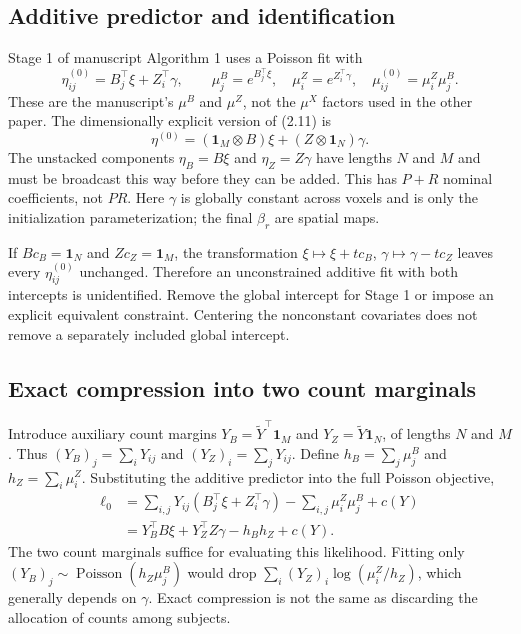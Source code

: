\documentclass[11pt,a4paper]{article}
\numberwithin{equation}{section}
\begin{document}
\subsection{Additive predictor and identification}
Stage 1 of manuscript Algorithm 1 uses a Poisson fit with
\[
 \eta_{ij}^{(0)}=B_j^\top\xi+Z_i^\top\gamma,\qquad
 \mu_j^B=e^{B_j^\top\xi},\quad \mu_i^Z=e^{Z_i^\top\gamma},\quad
 \mu_{ij}^{(0)}=\mu_i^Z\mu_j^B.
\]
These are the manuscript's $\mu^B$ and $\mu^Z$, not the
$\mu^X$ factors used in the other paper.
The dimensionally explicit version of (2.11) is
\[
 \eta^{(0)}=(\mathbf1_M\otimes B)\xi
                      +(Z\otimes\mathbf1_N)\gamma.
\]
The unstacked components $\eta_B=B\xi$ and $\eta_Z=Z\gamma$
have lengths $N$ and $M$ and must be broadcast this way before
they can be added.
This has $P+R$ nominal coefficients, not $PR$.
Here $\gamma$ is globally constant across voxels and is only the
initialization parameterization; the final $\beta_r$ are spatial maps.

If $Bc_B=\mathbf1_N$ and $Zc_Z=\mathbf1_M$, the transformation
$\xi\mapsto\xi+tc_B$, $\gamma\mapsto\gamma-tc_Z$ leaves every
$\eta_{ij}^{(0)}$ unchanged.
Therefore an unconstrained additive fit with both intercepts is
unidentified. Remove the global intercept for Stage 1 or impose an
explicit equivalent constraint.
Centering the nonconstant covariates does not remove a separately
included global intercept.

\subsection{Exact compression into two count marginals}
Introduce auxiliary count margins
$Y_B=\widetilde Y^\top\mathbf1_M$ and
$Y_Z=\widetilde Y\mathbf1_N$, of lengths $N$ and $M$.
Thus $(Y_B)_j=\sum_iY_{ij}$ and $(Y_Z)_i=\sum_jY_{ij}$.
Define $h_B=\sum_j\mu_j^B$ and $h_Z=\sum_i\mu_i^Z$.
Substituting the additive predictor into the full Poisson objective,
\begin{align}
 \ell_0
 &=\sum_{i,j}Y_{ij}(B_j^\top\xi+Z_i^\top\gamma)
                         -\sum_{i,j}\mu_i^Z\mu_j^B+c(Y)\\
 &=Y_B^\top B\xi+Y_Z^\top Z\gamma-h_Bh_Z+c(Y).
 \label{lesion-initial-ll}
\end{align}
The two count marginals suffice for evaluating this likelihood.
Fitting only $(Y_B)_j\sim\operatorname{Poisson}(h_Z\mu_j^B)$
would drop $\sum_i (Y_Z)_i\log(\mu_i^Z/h_Z)$, which generally depends on
$\gamma$. Exact compression is not the same as discarding the
allocation of counts among subjects.
\end{document}
